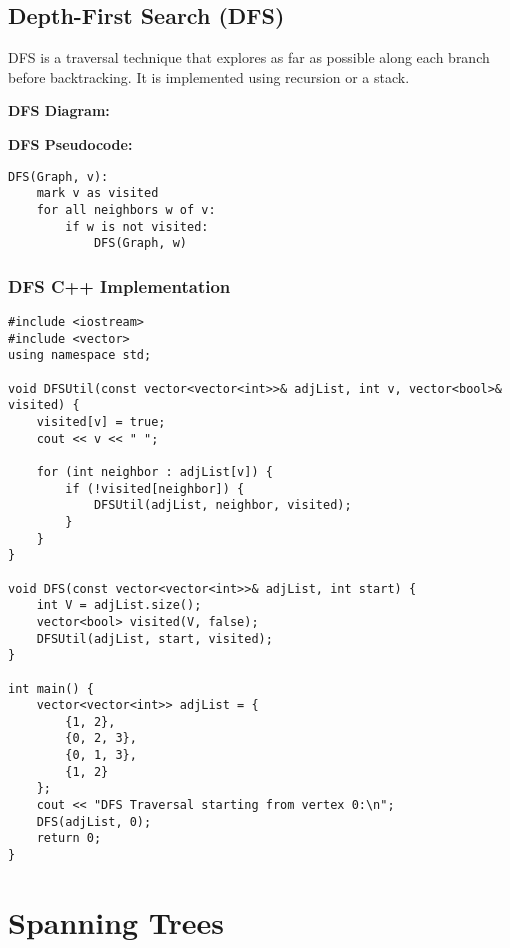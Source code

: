 \subsection{Depth-First Search (DFS)}
DFS is a traversal technique that explores as far as possible along each branch before backtracking. It is implemented using recursion or a stack.

\textbf{DFS Diagram:}
\begin{center}
\end{center}

\textbf{DFS Pseudocode:}
\begin{lstlisting}
DFS(Graph, v):
    mark v as visited
    for all neighbors w of v:
        if w is not visited:
            DFS(Graph, w)
\end{lstlisting}

\subsubsection{DFS C++ Implementation}
\begin{lstlisting}[caption={DFS in C++ using an Adjacency List}]
#include <iostream>
#include <vector>
using namespace std;

void DFSUtil(const vector<vector<int>>& adjList, int v, vector<bool>& visited) {
    visited[v] = true;
    cout << v << " ";

    for (int neighbor : adjList[v]) {
        if (!visited[neighbor]) {
            DFSUtil(adjList, neighbor, visited);
        }
    }
}

void DFS(const vector<vector<int>>& adjList, int start) {
    int V = adjList.size();
    vector<bool> visited(V, false);
    DFSUtil(adjList, start, visited);
}

int main() {
    vector<vector<int>> adjList = {
        {1, 2},
        {0, 2, 3},
        {0, 1, 3},
        {1, 2}
    };
    cout << "DFS Traversal starting from vertex 0:\n";
    DFS(adjList, 0);
    return 0;
}
\end{lstlisting}

\section{Spanning Trees}

